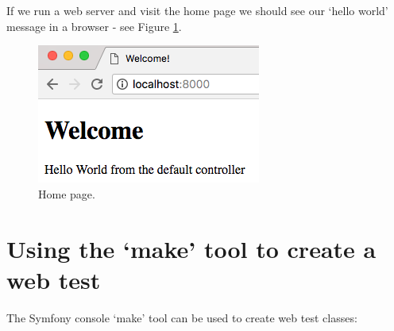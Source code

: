 \documentclass[a4paperpaper,openright]{book}
\begin{document}
If we run a web server and visit the home page we should see our `hello
world' message in a browser - see Figure \ref{homepage}.

\begin{figure}
\centering
\includegraphics{./tex2pdf.-05a85d9d563be472/a97f353efafa2faa98064075e63812a2b1cec288.png}
\caption{Home page. \label{homepage}}
\end{figure}

\hypertarget{using-the-make-tool-to-create-a-web-test}{%
\section{Using the `make' tool to create a web
test}\label{using-the-make-tool-to-create-a-web-test}}

The Symfony console `make' tool can be used to create web test classes:
\end{document}
